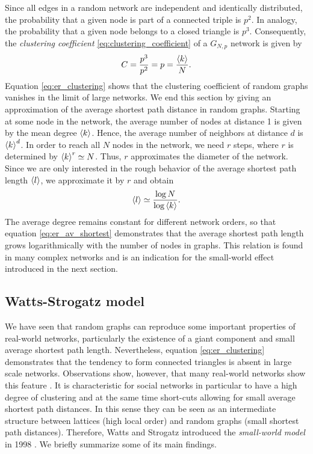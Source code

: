 Since all edges in a random network are independent and identically distributed, the probability that a given node is part of a connected triple is $p^2$.
In analogy, the probability that a given node belongs to a closed triangle is $p^3$.
Consequently, the \emph{clustering coefficient}  \eqref{eq:clustering_coefficient} of a $G_{N,p}$ network is given by
\begin{equation}\label{eq:er_clustering}
C=\frac{p^3}{p^2}=p=\frac{\left< k \right>}{N}.
\end{equation}
Equation \eqref{eq:er_clustering} shows that the clustering coefficient of random graphs vanishes in the limit of large networks.
We end this section by giving an approximation of the average shortest path distance in random graphs. 
Starting at some node in the network, the average number of nodes at distance 1 is given by the mean degree $\left< k \right>$. 
Hence, the average number of neighbors at distance $d$ is $\left< k \right>^d$.
In order to reach all $N$ nodes in the network, we need $r$ steps, where $r$ is determined by $\left< k \right>^r\simeq N$.
Thus, $r$ approximates the diameter of the network.
Since we are only interested in the rough behavior of the average shortest path length $\left< l \right>$, we approximate it by $r$ \citep{dynamical_processes} and obtain 
\begin{equation}\label{eq:er_av_shortest}
\left< l \right>\simeq \frac{\log N}{\log \left< k \right>}.
\end{equation}
The average degree remains constant for different network orders, so that equation \eqref{eq:er_av_shortest} demonstrates that the average shortest path length grows logarithmically with the number of nodes in \ER graphs.
This relation is found in many complex networks and is an indication for the small-world effect introduced in the next section.

\subsection{Watts-Strogatz model}\label{sec:watts_strogatz_model}
We have seen that random graphs can reproduce some important properties of real-world networks, particularly the existence of a giant component and small average shortest path length.
Nevertheless, equation \eqref{eq:er_clustering} demonstrates that the tendency to form connected triangles is absent in large scale \ER networks.
Observations show, however, that many real-world networks show this feature \citep{WassermanFaust,Newman2003,Milgram:1967}.
It is characteristic for social networks in particular to have a high degree of clustering and at the same time short-cuts allowing for small average shortest path distances.
In this sense they can be seen as an intermediate structure between lattices (high local order) and random graphs (small shortest path distances).
Therefore, Watts and Strogatz introduced the \emph{small-world model} in 1998 \citep{Watts:1998}.
We briefly summarize some of its main findings.


